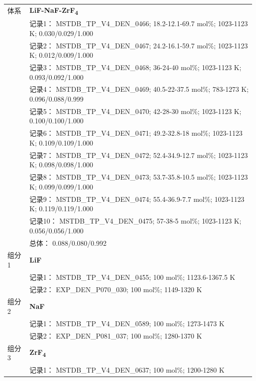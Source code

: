 \documentclass[12pt]{article}
\begin{document}
{\begin{longtable}[]{@{}
  >{\raggedright\arraybackslash}p{}
  >{\raggedright\arraybackslash}p{}@{}}
\midrule
体系 & \textbf{LiF-NaF-ZrF\textsubscript{4}} \\
 & 记录1： MSTDB\_TP\_V4\_DEN\_0466; 18.2-12.1-69.7 mol\%; 1023-1123 K; 0.030/0.029/1.000 \\
 & 记录2： MSTDB\_TP\_V4\_DEN\_0467; 24.2-16.1-59.7 mol\%; 1023-1123 K; 0.012/0.009/1.000 \\
 & 记录3： MSTDB\_TP\_V4\_DEN\_0468; 36-24-40 mol\%; 1023-1123 K; 0.093/0.092/1.000 \\
 & 记录4： MSTDB\_TP\_V4\_DEN\_0469; 40.5-22-37.5 mol\%; 783-1273 K; 0.096/0.088/0.999 \\
 & 记录5： MSTDB\_TP\_V4\_DEN\_0470; 42-28-30 mol\%; 1023-1123 K; 0.100/0.100/1.000 \\
 & 记录6： MSTDB\_TP\_V4\_DEN\_0471; 49.2-32.8-18 mol\%; 1023-1123 K; 0.109/0.109/1.000 \\
 & 记录7： MSTDB\_TP\_V4\_DEN\_0472; 52.4-34.9-12.7 mol\%; 1023-1123 K; 0.098/0.098/1.000 \\
 & 记录8： MSTDB\_TP\_V4\_DEN\_0473; 53.7-35.8-10.5 mol\%; 1023-1123 K; 0.099/0.099/1.000 \\
 & 记录9： MSTDB\_TP\_V4\_DEN\_0474; 55.4-36.9-7.7 mol\%; 1023-1123 K; 0.119/0.119/1.000 \\
 & 记录10： MSTDB\_TP\_V4\_DEN\_0475; 57-38-5 mol\%; 1023-1123 K; 0.056/0.056/1.000 \\
 & 总体： 0.088/0.080/0.992  \\

组分 1  & \textbf{LiF} \\
 & 记录1： MSTDB\_TP\_V4\_DEN\_0455; 100 mol\%; 1123.6-1367.5 K \\
 & 记录2： EXP\_DEN\_P070\_030; 100 mol\%; 1149-1320 K  \\

组分 2  & \textbf{NaF} \\
 & 记录1： MSTDB\_TP\_V4\_DEN\_0589; 100 mol\%; 1273-1473 K \\
 & 记录2： EXP\_DEN\_P081\_037; 100 mol\%; 1280-1370 K  \\

组分 3  & \textbf{ZrF\textsubscript{4}} \\
 & 记录1： MSTDB\_TP\_V4\_DEN\_0637; 100 mol\%; 1200-1280 K  \\


\end{longtable}}
\end{document}
